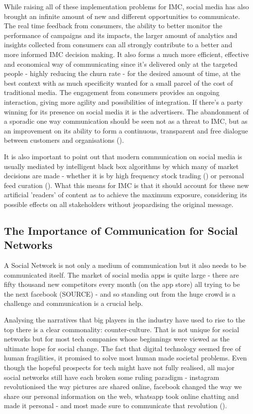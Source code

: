 \documentclass[12pt]{article}
\begin{document}
While raising all of these implementation problems for IMC, social media has also brought an infinite amount of new and different opportunities to communicate. The real time feedback from consumers, the ability to better monitor the performance of campaigns and its impacts, the larger amount of analytics and insights collected from consumers can all strongly contribute to a better and more informed IMC decision making. It also forms a much more efficient, effective and economical way of communicating since it's delivered only at the targeted people - highly reducing the churn rate - for the desired amount of time, at the best context with as much specificity wanted for a small parcel of the cost of traditional media. The engagement from consumers provides an ongoing interaction, giving more agility and possibilities of integration. If there's a party winning for its presence on social media it is the advertisers. The abandonment of a sporadic one way communication should be seen not as a threat to IMC, but as an improvement on its ability to form a continuous, transparent and free dialogue between customers and organisations (\cite{ananda}). 
 
It is also important to point out that modern communication on social media is usually mediated by intelligent black box algorithms by which many of market decisions are made - whether it is by high frequency stock trading (\cite{hft}) or personal feed curation (\cite{algo}). What this means for IMC is that it should account for these new artificial 'readers' of content as to achieve the maximum exposure, considering its possible effects on all stakeholders without jeopardising the original message.  

 \subsection{The Importance of Communication for Social Networks}\label{SN}

A Social Network is not only a medium of communication but it also needs to be communicated itself. The market of social media apps is quite large - there are fifty thousand new competitors every month (on the app store) all trying to be the next facebook (SOURCE) - and so standing out from the huge crowd is a challenge and communication is a crucial help.
 
Analysing the narratives that big players in the industry have used to rise to the top there is a clear commonality: counter-culture. That is not unique for social networks but for most tech companies whose beginnings were viewed as the ultimate hope for social change. The fact that digital technology seemed free of human fragilities, it promised to solve most human made societal problems. Even though the hopeful prospects for tech might have not fully realised, all major social networks still have each broken some ruling paradigm - instagram revolutionised the way pictures are shared online, facebook changed the way we share our personal information on the web, whatsapp took online chatting and made it personal - and most made sure to communicate that revolution (\cite{evil}).
 
\end{document}
